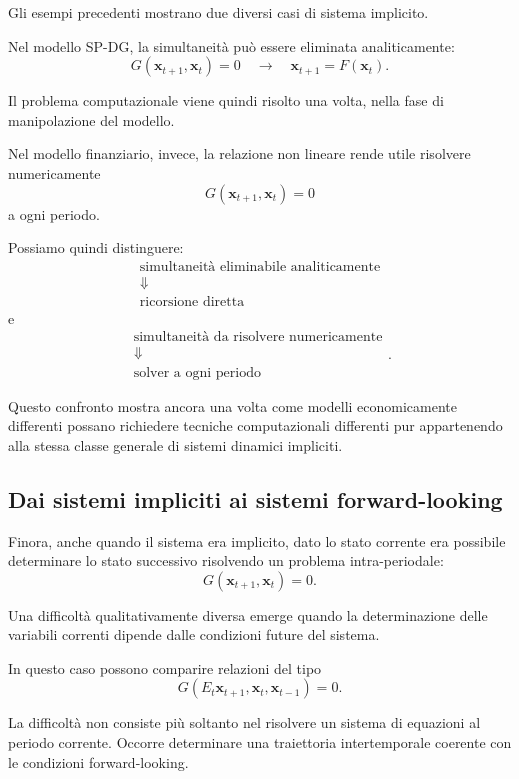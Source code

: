 \documentclass{book}
\begin{document}
Gli esempi precedenti mostrano due diversi casi di sistema implicito.

Nel modello SP-DG, la simultaneità può essere eliminata analiticamente:
\[
G(\mathbf{x}_{t+1},\mathbf{x}_t)=0
\quad\longrightarrow\quad
\mathbf{x}_{t+1}=F(\mathbf{x}_t).
\]

Il problema computazionale viene quindi risolto una volta, nella fase di
manipolazione del modello.

Nel modello finanziario, invece, la relazione non lineare rende utile
risolvere numericamente
\[
G(\mathbf{x}_{t+1},\mathbf{x}_t)=0
\]
a ogni periodo.

Possiamo quindi distinguere:
\[
\boxed{
\begin{array}{c}
\text{simultaneità eliminabile analiticamente}\\
\Downarrow\\
\text{ricorsione diretta}
\end{array}
}
\]
e
\[
\boxed{
\begin{array}{c}
\text{simultaneità da risolvere numericamente}\\
\Downarrow\\
\text{solver a ogni periodo}
\end{array}
}.
\]

Questo confronto mostra ancora una volta come modelli economicamente
differenti possano richiedere tecniche computazionali differenti pur
appartenendo alla stessa classe generale di sistemi dinamici impliciti.


\subsection{Dai sistemi impliciti ai sistemi forward-looking}

Finora, anche quando il sistema era implicito, dato lo stato corrente era
possibile determinare lo stato successivo risolvendo un problema
intra-periodale:
\[
G(\mathbf{x}_{t+1},\mathbf{x}_t)=0.
\]

Una difficoltà qualitativamente diversa emerge quando la determinazione
delle variabili correnti dipende dalle condizioni future del sistema.

In questo caso possono comparire relazioni del tipo
\[
G(E_t\mathbf{x}_{t+1},
\mathbf{x}_t,
\mathbf{x}_{t-1})=0.
\]

La difficoltà non consiste più soltanto nel risolvere un sistema di
equazioni al periodo corrente. Occorre determinare una traiettoria
intertemporale coerente con le condizioni forward-looking.
\end{document}
